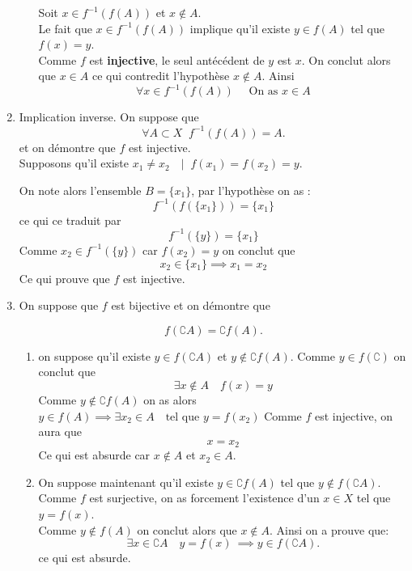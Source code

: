 \documentclass{report}
\begin{document}
\begin{myproof}
\begin{enumerate}
\begin{itemize}
  Soit $x \in f^{-1}(f(A))$ et $x\not\in A$.\\

  Le fait que $x \in f^{-1}(f(A))$ implique qu'il existe $y\in f(A)$ tel que
  $f(x) = y$.\\
  Comme $f$ est \textbf{injective}, le seul antécédent de $y$ est $x$. On
  conclut alors que 
  $x \in A$ ce qui contredit l'hypothèse $x\not \in A$. Ainsi 
  $$
  \forall x \in f^{-1}(f(A)) \quad \text{ On as } x \in A
  $$
  \end{itemize}
  
\item Implication inverse. On suppose que 
  $$
  \forall A \subset X\;\; f^{-1}(f(A)) = A.
  $$
  et on démontre que $f$ est injective.\\

  Supposons qu'il existe $ x_1 \not =  x_2 \quad |  \;\;f(x_1) = f(x_2) = y$.

  On note alors l'ensemble $B = \{x_1\}$, par l'hypothèse on as : 
  $$
  f^{-1}(f(\{x_1\})) = \{x_1\}
  $$
  ce qui ce traduit par
  $$
  f^{-1}(\{y\}) = \{x_1\}
  $$
  Comme $x_2 \in f^{-1}(\{y\})$ car $f(x_2) = y$ on conclut que
  $$
  x_2 \in \{x_1\} \implies x_1 = x_2
  $$
  Ce qui prouve que $f$ est injective.
\item On suppose que $f$ est bijective et on démontre que 

  $$
  f\left(\complement A\right) = \complement f(A).
  $$

  \begin{enumerate}
    \item on suppose qu'il existe $y \in f\left(\complement A\right)$ et $y\not
      \in \complement f(A)$. Comme $y\in f\left(\complement \right)$ on conclut
      que
      \begin{equation}
        \exists x \not \in A\quad f(x) = y
      \end{equation}
      Comme $y\not \in \complement f(A)$ on as alors $y \in f(A) \implies
      \exists x_2 \in A \quad \text{tel que } y=f(x_2)$
      Comme $f$ est injective, on aura que 
      $$
      x = x_2
      $$
      Ce qui est absurde car $x\not\in A$ et $x_2\in A$.
    \item On suppose maintenant qu'il existe $y\in \complement f(A)$ tel que $y
      \not \in f\left(\complement A\right)$.\\

      Comme $f$ est surjective, on as forcement l'existence d'un $x\in X$ tel  que $y = f(x)$.\\
      Comme $y\not \in f(A)$ on conclut alors que $x\not\in A$.
      Ainsi on a prouve que:
      $$
      \exists x \in \complement A \quad y=f(x)\ \implies y \in f(\complement A).
      $$
      ce qui est absurde.
  \end{enumerate}


\end{enumerate}
\end{myproof}
\end{document}
